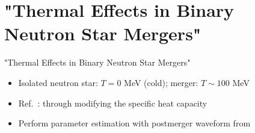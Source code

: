 \documentclass[usenames,dvipsnames,t]{beamer}
\begin{document}
\section{"Thermal Effects in Binary Neutron Star Mergers"}

\begin{frame}{"Thermal Effects in Binary Neutron Star Mergers"}

  \def\x{3mm}

  \begin{itemize}
    \item Isolated neutron star: $T = 0$ MeV (cold); merger: $T \sim 100$ MeV
    
    \vspace{\x}
    
    \item Ref.~\cite{Fields_2023}:  through modifying the specific heat capacity
    
    \vspace{\x}
    
    \item Perform parameter estimation with postmerger waveform from \cite{breschi2022kilohertz}
  \end{itemize}



\end{frame}
\end{document}
